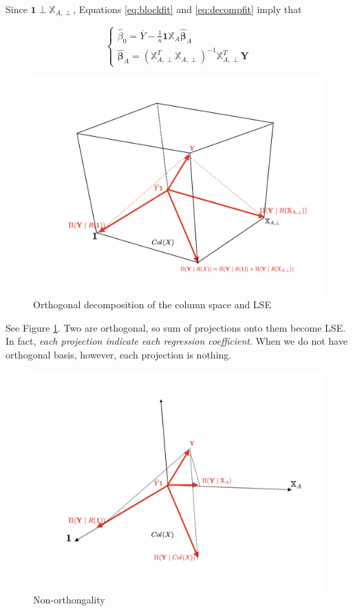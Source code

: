 \documentclass[]{book}
\theoremstyle{definition}
\theoremstyle{definition}
\theoremstyle{definition}
\theoremstyle{remark}
\begin{document}
Since \(\mathbf{1} \perp \mathbb{X}_{A, \perp}\), Equations \eqref{eq:blockfit} and \eqref{eq:decompfit} imply that

\[
\begin{cases}
  \hat\beta_0 = \overline{Y} - \frac{1}{n}\mathbf{1}\mathbb{X}_A\boldsymbol{\hat\beta}_A \\
  \boldsymbol{\hat\beta}_A = (\mathbb{X}_{A,\perp}^T\mathbb{X}_{A,\perp})^{-1}\mathbb{X}_{A,\perp}^T\mathbf{Y}
\end{cases}
\]

\begin{figure}[H]

{\centering \includegraphics[width=0.7\linewidth]{images/multiple-orthogonal} 

}

\caption{Orthogonal decomposition of the column space and LSE}\label{fig:illdecomp}
\end{figure}

See Figure \ref{fig:illdecomp}. Two are orthogonal, so sum of projections onto them become LSE. In fact, \emph{each projection indicate each regression coefficient}. When we do not have orthogonal basis, however, each projection is nothing.

\begin{figure}[H]

{\centering \includegraphics[width=0.7\linewidth]{images/multiple-nonorth} 

}

\caption{Non-orthongality}\label{fig:illdecomp2}
\end{figure}
\end{document}
